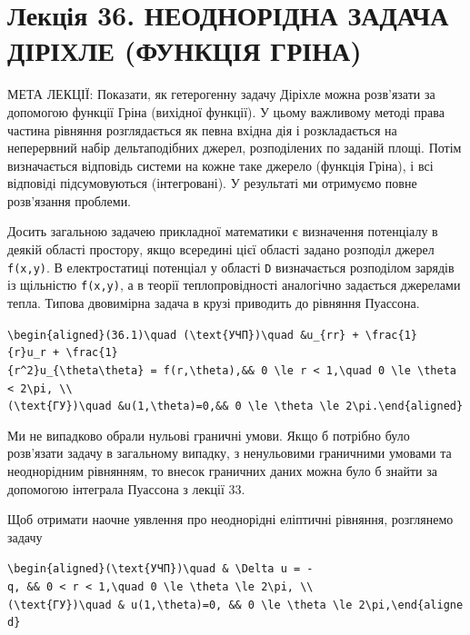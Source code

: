 \documentclass[
  ukrainian,
]{article}
\begin{document}
\section{Лекція 36. НЕОДНОРІДНА ЗАДАЧА ДІРІХЛЕ (ФУНКЦІЯ
ГРІНА)}\label{ux43bux435ux43aux446ux456ux44f-36.-ux43dux435ux43eux434ux43dux43eux440ux456ux434ux43dux430-ux437ux430ux434ux430ux447ux430-ux434ux456ux440ux456ux445ux43bux435-ux444ux443ux43dux43aux446ux456ux44f-ux433ux440ux456ux43dux430}

МЕТА ЛЕКЦІЇ: Показати, як гетерогенну задачу Діріхле можна розв'язати за
допомогою функції Гріна (вихідної функції). У цьому важливому методі
права частина рівняння розглядається як певна вхідна дія і розкладається
на неперервний набір дельтаподібних джерел, розподілених по заданій
площі. Потім визначається відповідь системи на кожне таке джерело
(функція Гріна), і всі відповіді підсумовуються (інтегровані). У
результаті ми отримуємо повне розв'язання проблеми.

Досить загальною задачею прикладної математики є визначення потенціалу в
деякій області простору, якщо всередині цієї області задано розподіл
джерел \texttt{f(x,y)}. В електростатиці потенціал у області \texttt{D}
визначається розподілом зарядів із щільністю \texttt{f(x,y)}, а в теорії
теплопровідності аналогічно задається джерелами тепла. Типова двовимірна
задача в крузі приводить до рівняння Пуассона.

\texttt{\textbackslash{}begin\{aligned\}(36.1)\textbackslash{}quad\ (\textbackslash{}text\{УЧП\})\textbackslash{}quad\ \&u\_\{rr\}\ +\ \textbackslash{}frac\{1\}\{r\}u\_r\ +\ \textbackslash{}frac\{1\}\{r\^{}2\}u\_\{\textbackslash{}theta\textbackslash{}theta\}\ =\ f(r,\textbackslash{}theta),\&\&\ 0\ \textbackslash{}le\ r\ \textless{}\ 1,\textbackslash{}quad\ 0\ \textbackslash{}le\ \textbackslash{}theta\ \textless{}\ 2\textbackslash{}pi,\ \textbackslash{}\textbackslash{}(\textbackslash{}text\{ГУ\})\textbackslash{}quad\ \&u(1,\textbackslash{}theta)=0,\&\&\ 0\ \textbackslash{}le\ \textbackslash{}theta\ \textbackslash{}le\ 2\textbackslash{}pi.\textbackslash{}end\{aligned\}}

Ми не випадково обрали нульові граничні умови. Якщо б потрібно було
розв'язати задачу в загальному випадку, з ненульовими граничними умовами
та неоднорідним рівнянням, то внесок граничних даних можна було б знайти
за допомогою інтеграла Пуассона з лекції 33.

Щоб отримати наочне уявлення про неоднорідні еліптичні рівняння,
розглянемо задачу

\texttt{\textbackslash{}begin\{aligned\}(\textbackslash{}text\{УЧП\})\textbackslash{}quad\ \&\ \textbackslash{}Delta\ u\ =\ -q,\ \&\&\ 0\ \textless{}\ r\ \textless{}\ 1,\textbackslash{}quad\ 0\ \textbackslash{}le\ \textbackslash{}theta\ \textbackslash{}le\ 2\textbackslash{}pi,\ \textbackslash{}\textbackslash{}(\textbackslash{}text\{ГУ\})\textbackslash{}quad\ \&\ u(1,\textbackslash{}theta)=0,\ \&\&\ 0\ \textbackslash{}le\ \textbackslash{}theta\ \textbackslash{}le\ 2\textbackslash{}pi,\textbackslash{}end\{aligned\}}
\end{document}
